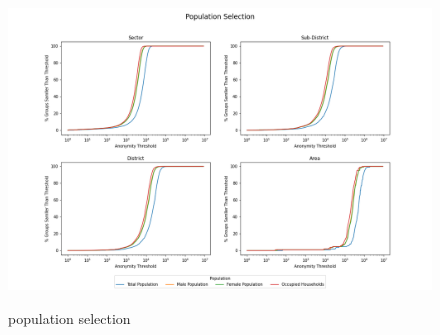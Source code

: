 \documentclass[12pt, a4paper]{article}
\begin{document}
\begin{figure}
\includegraphics[width=1\textwidth,trim={0.1cm, 0.1cm, 0.1cm, 0.1cm},clip]{images/population_selection.png}
\label{fig:population_selection}
\caption{population selection}
\end{figure}
\end{document}
